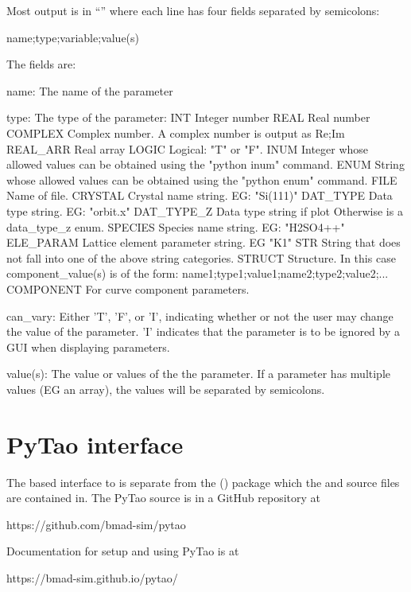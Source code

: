 Most output is in ``'' where each line has four fields separated by
semicolons:
\begin{example}
  {name};{type};{variable};{value(s)}
\end{example}
The fields are:
\begin{example}
    name:       The name of the parameter

    type:       The type of the parameter:
        INT           Integer number
        REAL          Real number
        COMPLEX       Complex number. A complex number is output as Re;Im
        REAL_ARR      Real array
        LOGIC         Logical: "T" or "F".
        INUM          Integer whose allowed values can be obtained 
                        using the "python inum" command.
        ENUM          String whose allowed values can be obtained 
                        using the "python enum" command.
        FILE          Name of file.
        CRYSTAL       Crystal name string. EG: "Si(111)"
        DAT_TYPE      Data type string. EG: "orbit.x"
        DAT_TYPE_Z    Data type string if plot%
                        Otherwise is a data_type_z enum.
        SPECIES       Species name string. EG: "H2SO4++"
        ELE_PARAM     Lattice element parameter string. EG "K1"
        STR           String that does not fall into one of the above string categories.
        STRUCT        Structure. In this case {component_value(s)} is of the form:
                        {name1};{type1};{value1};{name2};{type2};{value2};...
        COMPONENT     For curve component parameters.

    can_vary:   Either 'T', 'F', or 'I', indicating whether or not the
                user may change the value of the parameter. 'I' indicates
                that the parameter is to be ignored by a GUI when displaying parameters.

    value(s):   The value or values of the the parameter. If a parameter has multiple
                values (EG an array), the values will be separated by semicolons.
\end{example}

\section{PyTao interface}
\label{s:pytao}

The  based  interface to \tao is separate from the 
() package which the \bmad and \tao source files are contained in.
The PyTao source is in a GitHub repository at
\begin{example}
  https://github.com/bmad-sim/pytao
\end{example}
Documentation for setup and using PyTao is at
\begin{example}
  https://bmad-sim.github.io/pytao/
\end{example}

